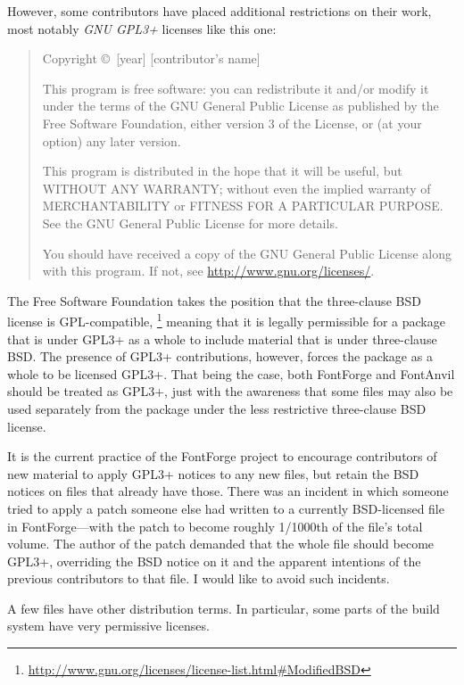 \documentclass[11pt]{report}
\begin{document}
However, some contributors have placed additional restrictions on their
work, most notably \emph{GNU GPL3+} licenses like this one:

\begin{quotation}
Copyright \copyright\ [year] [contributor's name]

This program is free software: you can redistribute it and/or modify
it under the terms of the GNU General Public License as published by
the Free Software Foundation, either version 3 of the License, or
(at your option) any later version.

This program is distributed in the hope that it will be useful,
but WITHOUT ANY WARRANTY; without even the implied warranty of
MERCHANTABILITY or FITNESS FOR A PARTICULAR PURPOSE.  See the
GNU General Public License for more details.

You should have received a copy of the GNU General Public License
along with this program.  If not, see
\url{http://www.gnu.org/licenses/}.
\end{quotation}

The Free Software Foundation takes the position that the three-clause BSD
license is GPL-compatible,%
\footnote{\url{http://www.gnu.org/licenses/license-list.html\#ModifiedBSD}}
meaning that it is legally permissible for a package that is under GPL3+ as
a whole to include material that is under three-clause BSD.  The presence of
GPL3+ contributions, however, forces the package as a whole to be licensed
GPL3+.  That being the case, both FontForge and FontAnvil should be treated
as GPL3+, just with the awareness that some files may also be used
separately from the package under the less restrictive three-clause BSD
license.

It is the current practice of the FontForge project to encourage
contributors of new material to apply GPL3+ notices to any new files, but
retain the BSD notices on files that already have those.  There was an
incident in which someone tried to apply a patch someone else had written to
a currently BSD-licensed file in FontForge---with the patch to become
roughly 1/1000th of the file's total volume.  The author of the patch
demanded that the whole file should become GPL3+, overriding the BSD notice
on it and the apparent intentions of the previous contributors to that file. 
I would like to avoid such incidents.

A few files have other distribution terms.  In particular, some parts of the
build system have very permissive licenses.
\end{document}

